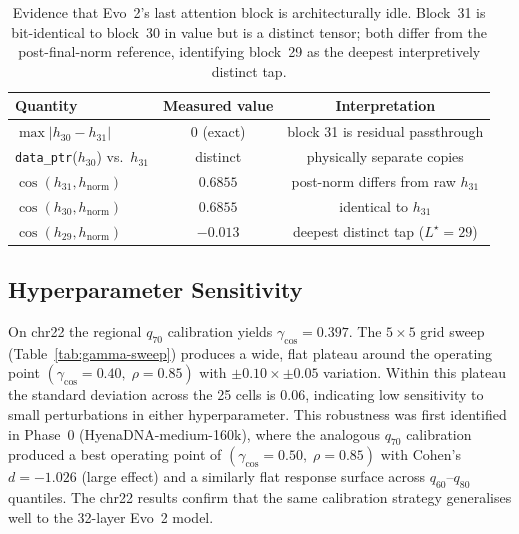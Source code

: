 \documentclass{article}
\theoremstyle{plain}
\theoremstyle{definition}
\theoremstyle{remark}
\newcommand{\hnorm}{h_{\mathrm{norm}}}
\begin{document}
\begin{table}[!htbp]
  \caption{Evidence that Evo~2's last attention block is architecturally
    idle. Block~31 is bit-identical to block~30 in value but is a distinct
    tensor; both differ from the post-final-norm reference, identifying
  block~29 as the deepest interpretively distinct tap.}
  \label{tab:idle-block}
  \centering
  \small
  \begin{tabular}{@{}lcc@{}}
    \toprule
    Quantity & Measured value & Interpretation \\
    \midrule
    $\max\bigl|h_{30}-h_{31}\bigr|$ & $0$ (exact) &
    block 31 is residual passthrough \\
    \texttt{data\_ptr}($h_{30}$) vs.\ $h_{31}$ & distinct &
    physically separate copies \\
    $\cos(h_{31}, \hnorm)$ & $0.6855$ &
    post-norm differs from raw $h_{31}$ \\
    $\cos(h_{30}, \hnorm)$ & $0.6855$ &
    identical to $h_{31}$ \\
    $\cos(h_{29}, \hnorm)$ & $-0.013$ &
    deepest distinct tap ($L^{\star}=29$) \\
    \bottomrule
  \end{tabular}
\end{table}

\subsection{Hyperparameter Sensitivity}
\label{app:gamma-sweep}

On chr22 the regional $q_{70}$ calibration yields
$\gamma_{\cos} = 0.397$. The $5\times 5$ grid sweep
(Table~\ref{tab:gamma-sweep}) produces a wide, flat plateau around the
operating point $(\gamma_{\cos}\!=\!0.40,\; \rho\!=\!0.85)$ with
$\pm 0.10 \times \pm 0.05$ variation. Within this plateau the standard
deviation across the 25 cells is $0.06$, indicating low sensitivity to
small perturbations in either hyperparameter. This robustness was first
identified in Phase~0 (HyenaDNA-medium-160k), where the analogous
$q_{70}$ calibration produced a best operating point of
$(\gamma_{\cos}\!=\!0.50,\; \rho\!=\!0.85)$ with Cohen's $d = -1.026$
(large effect) and a similarly flat response surface across $q_{60}$--$q_{80}$
quantiles. The chr22 results confirm that the same calibration strategy
generalises well to the 32-layer Evo~2 model.
\end{document}
